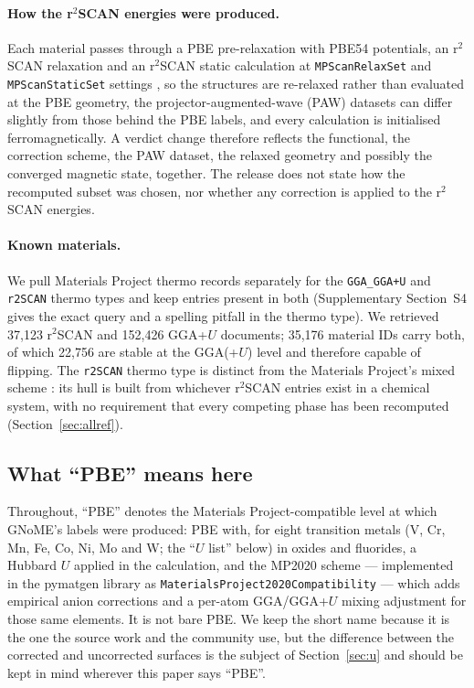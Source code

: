 \documentclass[11pt]{article}
\begin{document}
\paragraph{How the r$^2$SCAN energies were produced.} Each material passes through a
PBE pre-relaxation with PBE54 potentials, an r$^2$SCAN relaxation and an r$^2$SCAN
static calculation at \texttt{MPScanRelaxSet} and \texttt{MPScanStaticSet} settings
\citep{merchant2023}, so the structures are re-relaxed rather than evaluated at the PBE
geometry, the projector-augmented-wave (PAW) datasets can differ slightly from those behind the PBE labels, and
every calculation is initialised ferromagnetically. A verdict change therefore reflects
the functional, the correction scheme, the PAW dataset, the relaxed geometry and
possibly the converged magnetic state, together. The release does not state how the
recomputed subset was chosen, nor whether any correction is applied to the r$^2$SCAN
energies.

\paragraph{Known materials.} We pull Materials Project thermo records separately for the
\texttt{GGA\_GGA+U} and \texttt{r2SCAN} thermo types and keep entries present in both
(Supplementary Section~S4 gives the exact query and a spelling pitfall in the thermo
type). We retrieved 37{,}123 r$^2$SCAN and 152{,}426 GGA+$U$ documents; 35{,}176 material
IDs carry both, of which 22{,}756 are stable at the GGA(+$U$) level and therefore capable of
flipping. The \texttt{r2SCAN} thermo type is distinct from the Materials Project's mixed
scheme \citep{mpmixingdocs}: its hull is built from whichever r$^2$SCAN entries exist in
a chemical system, with no requirement that every competing phase has been recomputed
(Section~\ref{sec:allref}).

\subsection{What \texorpdfstring{``PBE''}{"PBE"} means here}

Throughout, ``PBE'' denotes the Materials Project-compatible level at which GNoME's
labels were produced: PBE with, for eight transition metals (V, Cr, Mn, Fe, Co, Ni, Mo
and W; the ``$U$ list'' below) in oxides and fluorides, a Hubbard $U$ applied in the
calculation, and the MP2020 scheme --- implemented in
the pymatgen library as \texttt{MaterialsProject2020Compatibility} --- which adds empirical anion
corrections and a per-atom GGA/GGA+$U$ mixing adjustment for those same elements. It is
not bare PBE. We keep the short name because it is the
one the source work and the community use, but the difference between the corrected and
uncorrected surfaces is the subject of Section~\ref{sec:u} and should be kept in mind
wherever this paper says ``PBE''.
\end{document}
